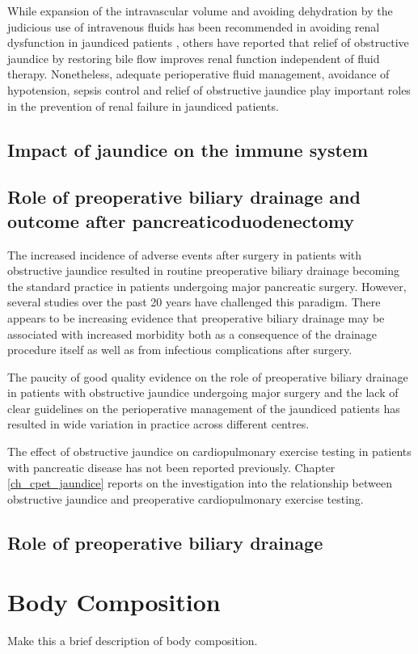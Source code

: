 While expansion of the intravascular volume and avoiding dehydration by the judicious use of intravenous fluids has been recommended in avoiding renal dysfunction in jaundiced patients \parencite{parks_prospective_1994}, others have reported that relief of obstructive jaundice by restoring bile flow improves renal function independent of fluid therapy.\parencite{padillo_randomized_2005} Nonetheless, adequate perioperative fluid management, avoidance of hypotension, sepsis control and relief of obstructive jaundice play important roles in the prevention of renal failure in jaundiced patients.

\subsection{Impact of jaundice on the immune system}

\subsection{Role of preoperative biliary drainage and outcome after pancreaticoduodenectomy}
The increased incidence of adverse events after surgery in patients with obstructive jaundice resulted in routine preoperative biliary drainage becoming the standard practice in patients undergoing major pancreatic surgery. However, several studies over the past 20 years have challenged this paradigm. There appears to be increasing evidence that preoperative biliary drainage may be associated with increased morbidity both as a consequence of the drainage procedure itself as well as from infectious complications after surgery.

The paucity of good quality evidence on the role of preoperative biliary drainage in patients with obstructive jaundice undergoing major surgery and the lack of clear guidelines on the perioperative management of the jaundiced patients has resulted in wide variation in practice across different centres. 

The effect of obstructive jaundice on cardiopulmonary exercise testing in patients with pancreatic disease has not been reported previously. Chapter \ref{ch_cpet_jaundice} reports on the investigation into the relationship between obstructive jaundice and preoperative cardiopulmonary exercise testing. 


\subsection{Role of preoperative biliary drainage}

\section{Body Composition}
Make this a brief description of body composition.
